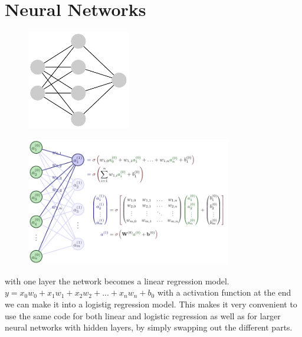 \documentclass[twoside,11pt]{report}
\begin{document}
\section{Neural Networks}
\label{sec:NN}


\begin{figure}
    \begin{center}
        \includegraphics[width=0.4\textwidth]{tikzfigures/nn.pdf}
    \end{center}
    \caption{}\label{fig:nn}
    \cite{neutelings_tikzcode}
\end{figure}
\begin{figure}
    \begin{center}
        \includegraphics[width=0.8\textwidth]{tikzfigures/nnActivation.pdf}
    \end{center}
    \caption{}\label{fig:}
    \cite{neutelings_tikzcode}
\end{figure}

with one layer the network becomes a linear regression model. $y = x_0w_0 + x_1w_1 + x_2w_2 + ... + x_nw_n + b_0$ with a activation function at the end we can make it into a logistig regression model.
This makes it very convenient to use the same code for both linear and logistic regression as well as for 
larger neural networks with hidden layers, by simply swapping out the different parts.
\end{document}
